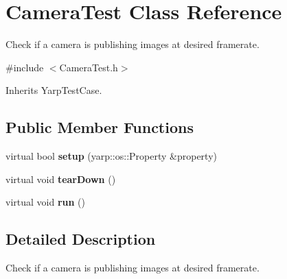 \section{Camera\-Test Class Reference}
\label{classCameraTest}


Check if a camera is publishing images at desired framerate.  




{\ttfamily \#include $<$Camera\-Test.\-h$>$}



Inherits Yarp\-Test\-Case.

\subsection*{Public Member Functions}
\begin{DoxyCompactItemize}
\item 
virtual bool {\bfseries setup} (yarp\-::os\-::\-Property \&property)\label{classCameraTest_ac059968960ce6deaee9c60623ba2266d}

\item 
virtual void {\bfseries tear\-Down} ()\label{classCameraTest_a9d99fe4d4b8929fbfaf280ed87388dc2}

\item 
virtual void {\bfseries run} ()\label{classCameraTest_a1c55590d1e9b43051fa8a818559abff2}

\end{DoxyCompactItemize}


\subsection{Detailed Description}
Check if a camera is publishing images at desired framerate. 

